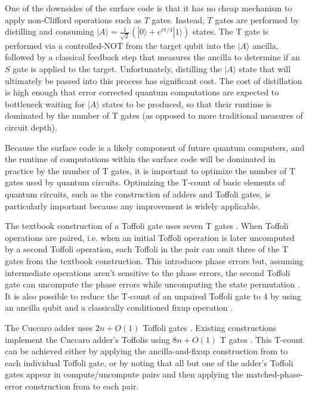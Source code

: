 \documentclass[twocolumn]{revtex4-1}
\begin{document}
One of the downsides of the surface code is that it has no cheap mechanism to apply non-Clifford operations such as $T$ gates.
Instead, $T$ gates are performed by distilling and consuming $|A\rangle = \frac{1}{\sqrt{2}} (|0\rangle + e^{i \pi/4} |1\rangle)$ states.
The T gate is performed via a controlled-NOT from the target qubit into the $|A\rangle$ ancilla, followed by a classical feedback step that measures the ancilla to determine if an $S$ gate is applied to the target.
Unfortunately, distilling the $|A\rangle$ state that will ultimately be passed into this process has significant cost.
The cost of distillation is high enough that error corrected quantum computations are expected to bottleneck waiting for $|A\rangle$ states to be produced, so that their runtime is dominated by the number of T gates (as opposed to more traditional measures of circuit depth).

Because the surface code is a likely component of future quantum computers, and the runtime of computations within the surface code will be dominated in practice by the number of T gates, it is important to optimize the number of T gates used by quantum circuits.
Optimizing the T-count of basic elements of quantum circuits, such as the construction of adders and Toffoli gates, is particularly important because any improvement is widely applicable.

The textbook construction of a Toffoli gate uses seven T gates \citep{Nielsen2009}.
When Toffoli operations are paired, i.e. when an initial Toffoli operation is later uncomputed by a second Toffoli operation, each Toffoli in the pair can omit three of the T gates from the textbook construction.
This introduces phase errors but, assuming intermediate operations aren't sensitive to the phase errors, the second Toffoli gate can uncompute the phase errors while uncomputing the state permutation \citep{Barenco1995, Nielsen2009}.
It is also possible to reduce the T-count of an unpaired Toffoli gate to 4 by using an ancilla qubit and a classically conditioned fixup operation \citep{Jones2013}.


The Cuccaro adder uses $2n + O(1)$ Toffoli gates \citep{Cuccaro2004}.
Existing constructions implement the Cuccaro adder's Toffolis using $8n + O(1)$ T gates \citep{Barenco1995, Cuccaro2004, Amy2013}.
This T-count can be achieved either by applying the ancilla-and-fixup construction from \citep{Jones2013} to each individual Toffoli gate, or by noting that all but one of the adder's Toffoli gates appear in compute/uncompute pairs and then applying the matched-phase-error construction from \citep{Barenco1995, Nielsen2009} to each pair.
\end{document}
